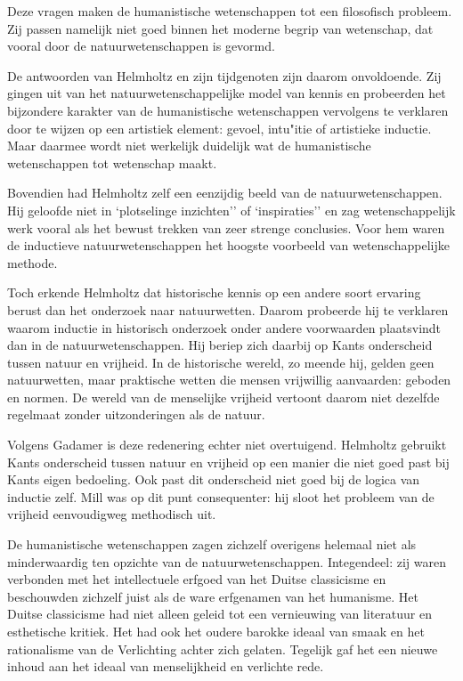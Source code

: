 Deze vragen maken de humanistische wetenschappen tot een filosofisch probleem. Zij passen namelijk niet goed binnen het moderne begrip van wetenschap, dat vooral door de natuurwetenschappen is gevormd.

De antwoorden van Helmholtz en zijn tijdgenoten zijn daarom onvoldoende. Zij gingen uit van het natuurwetenschappelijke model van kennis en probeerden het bijzondere karakter van de humanistische wetenschappen vervolgens te verklaren door te wijzen op een artistiek element: gevoel, intu"itie of artistieke inductie. Maar daarmee wordt niet werkelijk duidelijk wat de humanistische wetenschappen tot wetenschap maakt.

Bovendien had Helmholtz zelf een eenzijdig beeld van de natuurwetenschappen. Hij geloofde niet in `plotselinge inzichten'' of `inspiraties'' en zag wetenschappelijk werk vooral als het bewust trekken van zeer strenge conclusies. Voor hem waren de inductieve natuurwetenschappen het hoogste voorbeeld van wetenschappelijke methode.

Toch erkende Helmholtz dat historische kennis op een andere soort ervaring berust dan het onderzoek naar natuurwetten. Daarom probeerde hij te verklaren waarom inductie in historisch onderzoek onder andere voorwaarden plaatsvindt dan in de natuurwetenschappen. Hij beriep zich daarbij op Kants onderscheid tussen natuur en vrijheid. In de historische wereld, zo meende hij, gelden geen natuurwetten, maar praktische wetten die mensen vrijwillig aanvaarden: geboden en normen. De wereld van de menselijke vrijheid vertoont daarom niet dezelfde regelmaat zonder uitzonderingen als de natuur.

Volgens Gadamer is deze redenering echter niet overtuigend. Helmholtz gebruikt Kants onderscheid tussen natuur en vrijheid op een manier die niet goed past bij Kants eigen bedoeling. Ook past dit onderscheid niet goed bij de logica van inductie zelf. Mill was op dit punt consequenter: hij sloot het probleem van de vrijheid eenvoudigweg methodisch uit.

De humanistische wetenschappen zagen zichzelf overigens helemaal niet als minderwaardig ten opzichte van de natuurwetenschappen. Integendeel: zij waren verbonden met het intellectuele erfgoed van het Duitse classicisme en beschouwden zichzelf juist als de ware erfgenamen van het humanisme. Het Duitse classicisme had niet alleen geleid tot een vernieuwing van literatuur en esthetische kritiek. Het had ook het oudere barokke ideaal van smaak en het rationalisme van de Verlichting achter zich gelaten. Tegelijk gaf het een nieuwe inhoud aan het ideaal van menselijkheid en verlichte rede.


